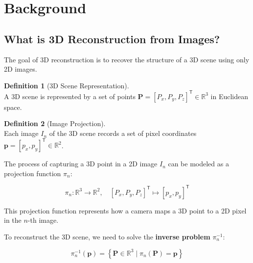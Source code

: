 \documentclass[12pt]{article}
\newcommand{\R}{\mathbb{R}}
\newcommand{\vect}[1]{\bm{#1}}
\theoremstyle{definition}
\newtheorem{definition}{Definition}[subsection]
\begin{document}
\tableofcontents

\newpage
\section{Background} \label{sec:background}

\subsection{What is 3D Reconstruction from Images?} \label{sec:reconstruction_intro}

The goal of 3D reconstruction is to recover the structure of a 3D scene using only 2D images.

\begin{definition}[3D Scene Representation] \label{def:scene_repr} ~\\
A 3D scene is represented by a set of points $\vect{P} = [P_x, P_y, P_z]^\mathsf{T} \in \R^3$ in Euclidean space.
\end{definition}

\begin{definition}[Image Projection] \label{def:image_proj} ~\\
Each image $I_n$ of the 3D scene records a set of pixel coordinates $\vect{p} = [p_x, p_y]^\mathsf{T} \in \R^2$.
\end{definition}

The process of capturing a 3D point in a 2D image $I_n$ can be modeled as a projection function $\pi_n$:

\vspace{0.5em}
\begin{equation}
\boxed{\pi_n: \R^3 \to \R^2, \quad [P_x, P_y, P_z]^\mathsf{T} \mapsto [p_x, p_y]^\mathsf{T}} \label{eq:proj}
\end{equation}
\vspace{0.5em}

This projection function represents how a camera maps a 3D point to a 2D pixel in the $n$-th image.

To reconstruct the 3D scene, we need to solve the \textbf{inverse problem} $\pi_n^{-1}$:

\vspace{0.5em}
\begin{equation}
\boxed{\pi_n^{-1}(\vect{p}) = \left\{ \vect{P} \in \R^3 \mid \pi_n(\vect{P}) = \vect{p} \right\}} \label{eq:invproj}
\end{equation}
\vspace{0.5em}
\end{document}
